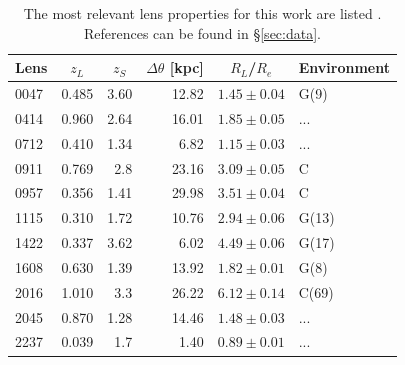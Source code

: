 \documentclass[useAMS,usenatbib]{mn2e}
\begin{document}
\begin{table}
  \begin{center}
    \begin{tabular}{l r r r r l}
      Lens    & \multicolumn{1}{c}{$z_{L}$} & \multicolumn{1}{c}{$z_{S}$} & \multicolumn{1}{c}{$\Delta\theta$ [kpc]} & \multicolumn{1}{c}{$R_{L}$/$R_{e}$} & Environment \\ \hline
      0047 & 0.485 & 3.60 & 12.82 & $1.45\pm0.04$ & G(9) \\
      0414 & 0.960 & 2.64 & 16.01 & $1.85\pm0.05$ & ... \\
      0712 & 0.410 & 1.34 & 6.82  & $1.15\pm0.03$ & ... \\
      0911 & 0.769 & 2.8  & 23.16 & $3.09\pm0.05$ & C \\
      0957 & 0.356 & 1.41 & 29.98 & $3.51\pm0.04$ & C \\
      1115 & 0.310 & 1.72 & 10.76 & $2.94\pm0.06$ & G(13) \\
      1422 & 0.337 & 3.62 & 6.02  & $4.49\pm0.06$ & G(17) \\
      1608 & 0.630 & 1.39 & 13.92 & $1.82\pm0.01$ & G(8) \\
      2016 & 1.010 & 3.3  & 26.22 & $6.12\pm0.14$ & C(69) \\
      2045 & 0.870 & 1.28 & 14.46 & $1.48\pm0.03$ & ... \\
      2237 & 0.039 & 1.7  & 1.40  & $0.89\pm0.01$ & ... \\
    \end{tabular}
    \caption[width=\linewidth]{The most relevant lens properties for this work are listed \citep[for an expanded version of this table see][]{2011ApJ...740...97L}. References can be found in \S\ref{sec:data}.}
    \label{tab:lensproperties}
  \end{center}
\end{table}
\end{document}
